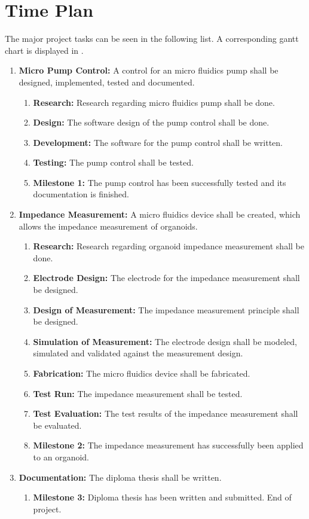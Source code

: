 \documentclass{article}
\begin{document}
\section{Time Plan}
\label{sec:time_plan}

The major project tasks can be seen in the following list. A corresponding gantt chart is displayed in .
\begin{enumerate}
\item \textbf{Micro Pump Control:} A control for an micro fluidics pump shall be designed, implemented, tested and documented.
    \begin{enumerate}
        \item \textbf{Research:} Research regarding micro fluidics pump shall be done. 
        \item \textbf{Design:} The software design of the pump control shall be done.
        \item \textbf{Development:} The software for the pump control shall be written.
        \item \textbf{Testing:} The pump control shall be tested.
        \item \textbf{Milestone 1:} The pump control has been successfully tested and its documentation is finished.
    \end{enumerate}
\item \textbf{Impedance Measurement:} A micro fluidics device shall be created, which allows the impedance measurement of organoids.
    \begin{enumerate}
        \item \textbf{Research:} Research regarding organoid impedance measurement shall be done. 
        \item \textbf{Electrode Design:} The electrode for the impedance measurement shall be designed.
        \item \textbf{Design of Measurement:} The impedance measurement principle shall be designed.
        \item \textbf{Simulation of Measurement:} The electrode design shall be modeled, simulated and validated against the measurement design.
        \item \textbf{Fabrication:} The micro fluidics device shall be fabricated.
        \item \textbf{Test Run:} The impedance measurement shall be tested.
        \item \textbf{Test Evaluation:} The test results of the impedance measurement shall be evaluated.
        \item \textbf{Milestone 2:} The impedance measurement has successfully been applied to an organoid.
    \end{enumerate}
\item \textbf{Documentation:} The diploma thesis shall be written.
    \begin{enumerate}
        \item \textbf{Milestone 3:} Diploma thesis has been written and submitted. End of project.
    \end{enumerate}
\end{enumerate}
 


 
 
 
 
\end{document}
